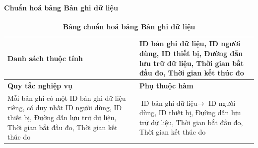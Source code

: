 \paragraph{Chuẩn hoá bảng Bản ghi dữ liệu}
\mbox{}
\begin{table}[H]
	\caption{\bfseries \fontsize{12pt}{0pt}\selectfont Bảng chuẩn hoá bảng Bản ghi dữ liệu}
	\centering
	\begin{tabularx}{0.9\textwidth}{|X|X|}
		\hline
		\textbf{Danh sách thuộc tính} & ID bản ghi dữ liệu, ID người dùng, ID thiết bị,
		Đường dẫn lưu trữ dữ liệu, Thời gian bắt đầu đo, Thời gian kết thúc đo                                                     \\
		\hline
		\textbf{Quy tắc nghiệp vụ}    & \textbf{Phụ thuộc hàm}                                                                     \\
		\hline
		Mỗi bản ghi có một ID bản ghi dữ liệu riêng, có duy nhất ID người dùng, ID thiết bị,
		Đường dẫn lưu trữ dữ liệu, Thời gian bắt đầu đo, Thời gian kết thúc đo
		                              & \parbox[t]{\linewidth}{$\text{ID bản ghi dữ liệu} \rightarrow$ ID người dùng, ID thiết bị,
		Đường dẫn lưu trữ dữ liệu, Thời gian bắt đầu đo, Thời gian kết thúc đo}                                                    \\
		\hline
		                                         \\
		                                                   \\
		\hline
	\end{tabularx}
\end{table}


